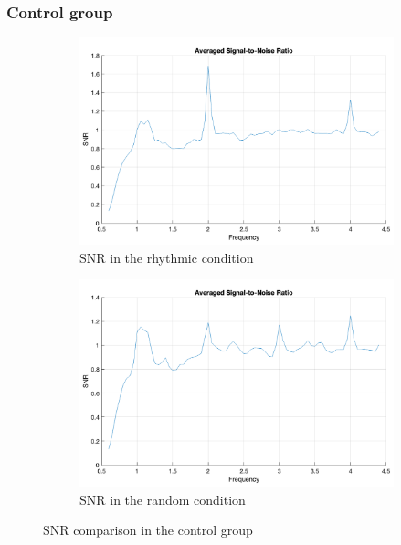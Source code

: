 \subsubsection*{Control group}
\begin{figure}[H]
    \centering
    \begin{subfigure}[b]{0.48\textwidth}
        \centering
        \includegraphics[width=\textwidth]{healthy_images/rhythmic_condition_snr.png}
        \caption{SNR in the rhythmic condition}
        \label{fig: snr_rhythmic: control}
    \end{subfigure}
    \hfill
    \begin{subfigure}[b]{0.48\textwidth}
        \centering
        \includegraphics[width=\textwidth]{healthy_images/random_condition_snr.png}
        \caption{SNR in the random condition}
        \label{fig: snr_random: control}
    \end{subfigure}
    \caption{SNR comparison in the control group}
    \label{fig: snr_control_group}
\end{figure}


